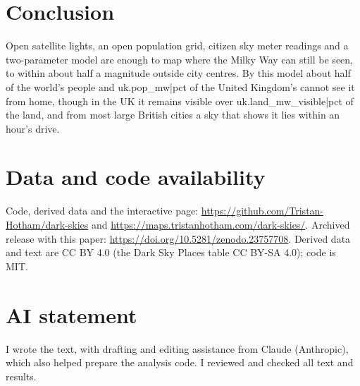 \documentclass[11pt,a4paper]{article}
\begin{document}
\section{Conclusion}
Open satellite lights, an open population grid, citizen sky meter readings and a two-parameter model are enough to map where the Milky Way can still be seen, to within about half a magnitude outside city centres. By this model about half of the world's people and {{uk.pop_mw|pct}} of the United Kingdom's cannot see it from home, though in the UK it remains visible over {{uk.land_mw_visible|pct}} of the land, and from most large British cities a sky that shows it lies within an hour's drive.

\section*{Data and code availability}
Code, derived data and the interactive page: \url{https://github.com/Tristan-Hotham/dark-skies} and \url{https://maps.tristanhotham.com/dark-skies/}. Archived release with this paper: \url{https://doi.org/10.5281/zenodo.23757708}. Derived data and text are CC BY 4.0 (the Dark Sky Places table CC BY-SA 4.0); code is MIT.

\section*{AI statement}
I wrote the text, with drafting and editing assistance from Claude (Anthropic), which also helped prepare the analysis code. I reviewed and checked all text and results.
\end{document}
